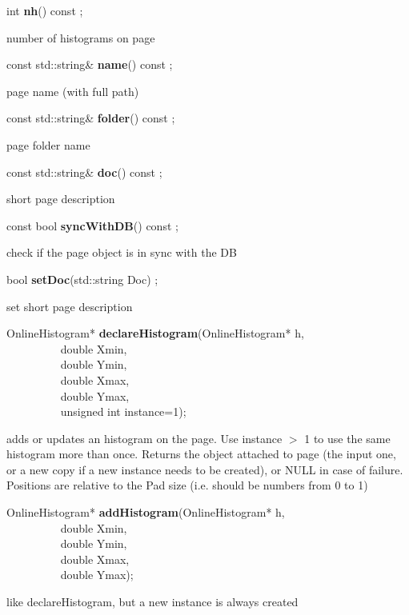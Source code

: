 \item    int {\bf nh}() const ;

 number of histograms on page


\item    const std::string\& {\bf name}() const ;

 page name (with full path)


\item    const std::string\& {\bf folder}() const ;

 page folder name


\item    const std::string\& {\bf doc}() const ;

 short page description


\item    const bool {\bf syncWithDB}() const ;

 check if the page object is in sync with the DB


\item    bool {\bf setDoc}(std::string Doc) ;

 set short page description


\item    OnlineHistogram* {\bf declareHistogram}(OnlineHistogram* h,\\\mbox{}~~~~~~~~~
				    double Xmin,\\\mbox{}~~~~~~~~~
				    double Ymin,\\\mbox{}~~~~~~~~~
				    double Xmax,\\\mbox{}~~~~~~~~~
				    double Ymax,\\\mbox{}~~~~~~~~~
				    unsigned int instance=1);

 adds or updates an histogram on the page. Use instance $>$ 1 to use the
 same histogram more than once. Returns the object attached to page (the input
 one, or a new copy if a new instance needs to be created), or NULL in case of failure.
 Positions are relative to the Pad size (i.e. should be numbers from 0 to 1)


\item    OnlineHistogram* {\bf addHistogram}(OnlineHistogram* h,\\\mbox{}~~~~~~~~~
				    double Xmin,\\\mbox{}~~~~~~~~~
				    double Ymin,\\\mbox{}~~~~~~~~~
				    double Xmax,\\\mbox{}~~~~~~~~~
				    double Ymax);

 like declareHistogram, but a new instance is always created


